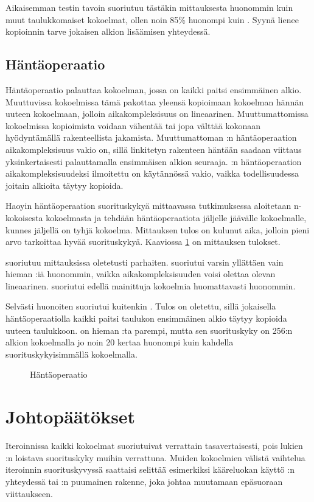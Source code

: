 Aikaisemman testin tavoin  suoriutuu tästäkin mittauksesta huonommin kuin muut taulukkomaiset kokoelmat, ollen noin 85\% huonompi kuin . Syynä lienee kopioinnin tarve jokaisen alkion lisäämisen yhteydessä.


\subsection{Häntäoperaatio}
Häntäoperaatio palauttaa kokoelman, jossa on kaikki paitsi ensimmäinen alkio. Muuttuvissa kokoelmissa tämä pakottaa yleensä kopioimaan kokoelman hännän uuteen kokoelmaan, jolloin aikakompleksisuus on lineaarinen. Muuttumattomissa kokoelmissa kopioimista voidaan vähentää tai jopa välttää kokonaan hyödyntämällä rakenteellista jakamista. Muuttumattoman :n häntäoperaation aikakompleksisuus vakio on, sillä linkitetyn rakenteen häntään saadaan viittaus yksinkertaisesti palauttamalla ensimmäisen alkion seuraaja. :n häntäoperaation aikakompleksisuudeksi ilmoitettu on käytännössä vakio\cite{scalaCollections}, vaikka todellisuudessa joitain alkioita täytyy kopioida.

Haoyin\cite{haoyiBenchmark} häntäoperaation suorituskykyä mittaavassa tutkimuksessa aloitetaan n-kokoisesta kokoelmasta ja tehdään häntäoperaatiota jäljelle jäävälle kokoelmalle, kunnes jäljellä on tyhjä kokoelma. Mittauksen tulos on kulunut aika, jolloin pieni arvo tarkoittaa hyvää suorituskykyä. Kaaviossa \ref{hantaoperaatio_kaavio} on mittauksen tulokset.

 suoriutuu mittauksissa oletetusti parhaiten.  suoriutui varsin yllättäen vain hieman :iä huonommin, vaikka aikakompleksisuuden voisi olettaa olevan lineaarinen.  suoriutui edellä mainittuja kokoelmia huomattavasti huonommin.

Selvästi huonoiten suoriutui kuitenkin . Tulos on oletettu, sillä jokaisella häntäoperaatiolla kaikki paitsi taulukon ensimmäinen alkio täytyy kopioida uuteen taulukkoon.  on hieman :ta parempi, mutta sen suorituskyky on 256:n alkion kokoelmalla jo noin 20 kertaa huonompi kuin kahdella suorituskykyisimmällä kokoelmalla.

\begin{figure}[h]
    \centering
    
    \caption{Häntäoperaatio}\label{hantaoperaatio_kaavio}
\end{figure}


\section{Johtopäätökset}
Iteroinnissa kaikki kokoelmat suoriutuivat verrattain tasavertaisesti, pois lukien \\:n loistava suorituskyky muihin verrattuna. Muiden kokoelmien välistä vaihtelua iteroinnin suorituskyvyssä saattaisi selittää esimerkiksi kääreluokan käyttö :n yhteydessä tai :n puumainen rakenne, joka johtaa muutamaan epäsuoraan viittaukseen.

